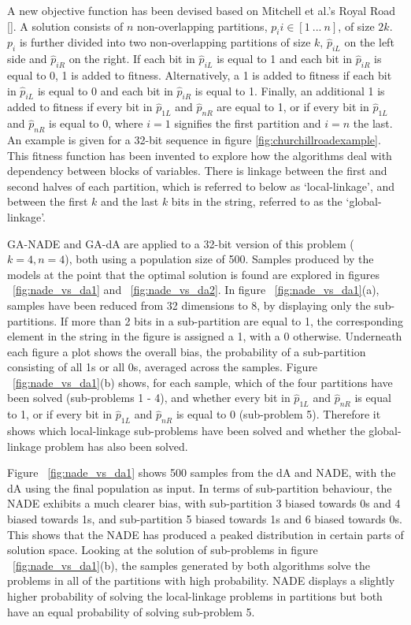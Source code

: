 \documentclass[twoside]{article}
\begin{document}
A new objective function has been devised based on Mitchell et al.'s Royal Road [\cite{mitchell}]. A solution consists of \(n\) non-overlapping partitions, \(p_i i\in{[1\ ... \ n]}\), of size \(2k\). \(p_i\) is further divided into two non-overlapping partitions of size \(k\), \(\hat{p}_{iL}\) on the left side and \(\hat{p}_{iR}\) on the right. If each bit in \(\hat{p}_{iL}\) is equal to 1 and each bit in \(\hat{p}_{iR}\) is equal to 0, 1 is added to fitness. Alternatively, a 1 is added to fitness if each bit in \(\hat{p}_{iL}\) is equal to 0 and each bit in \(\hat{p}_{iR}\) is equal to 1. Finally, an additional 1 is added to fitness if every bit in \(\hat{p}_{1L}\) and \(\hat{p}_{nR}\) are equal to 1, or if every bit in \(\hat{p}_{1L}\) and \(\hat{p}_{nR}\) is equal to 0, where \(i=1\) signifies the first partition and \(i=n\) the last. An example is given for a 32-bit sequence in figure \ref{fig:churchillroadexample}. This fitness function has been invented to explore how the algorithms deal with dependency between blocks of variables. There is linkage between the first and second halves of each partition, which is referred to below as `local-linkage', and between the first \(k\) and the last \(k\) bits in the string, referred to as the `global-linkage'.

GA-NADE and GA-dA are applied to a 32-bit version of this problem (\(k=4,n=4\)), both using a population size of 500. Samples produced by the models at the point that the optimal solution is found are explored in figures ~\ref{fig:nade_vs_da1} and ~\ref{fig:nade_vs_da2}. In figure ~\ref{fig:nade_vs_da1}(a), samples have been reduced from 32 dimensions to 8, by displaying only the sub-partitions. If more than 2 bits in a sub-partition are equal to 1, the corresponding element in the string in the figure is assigned a 1, with a 0 otherwise. Underneath each figure a plot shows the overall bias, the probability of a sub-partition consisting of all 1s or all 0s, averaged across the samples. Figure ~\ref{fig:nade_vs_da1}(b) shows, for each sample, which of the four partitions have been solved (sub-problems 1 - 4), and whether every bit in \(\hat{p}_{1L}\) and \(\hat{p}_{nR}\) is equal to 1, or if every bit in \(\hat{p}_{1L}\) and \(\hat{p}_{nR}\) is equal to 0 (sub-problem 5). Therefore it shows which local-linkage sub-problems have been solved and whether the global-linkage problem has also been solved.

Figure ~\ref{fig:nade_vs_da1} shows 500 samples from the dA and NADE, with the dA using the final population as input. In terms of sub-partition behaviour, the NADE exhibits a much clearer bias, with sub-partition 3 biased towards 0s and 4 biased towards 1s, and sub-partition 5 biased towards 1s and 6 biased towards 0s. This shows that the NADE has produced a peaked distribution in certain parts of solution space. Looking at the solution of sub-problems in figure ~\ref{fig:nade_vs_da1}(b), the samples generated by both algorithms solve the problems in all of the partitions with high probability. NADE displays a slightly higher probability of solving the local-linkage problems in partitions but both have an equal probability of solving sub-problem 5.
\end{document}
